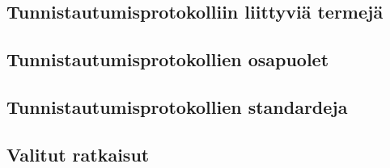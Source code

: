 
\subsection{Tunnistautumisprotokolliin liittyviä termejä}

\subsection{Tunnistautumisprotokollien osapuolet}

\subsection{Tunnistautumisprotokollien standardeja}

\subsection{Valitut ratkaisut}
